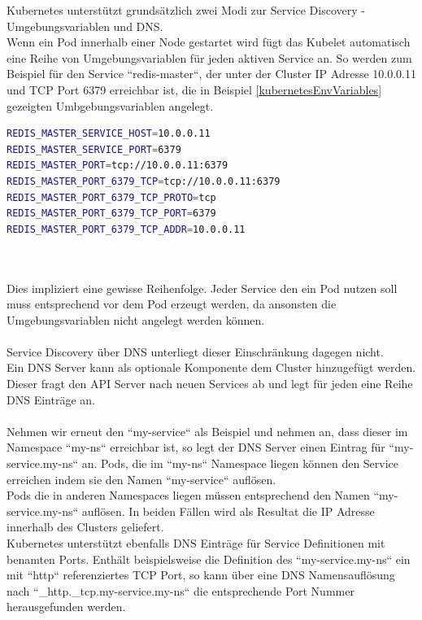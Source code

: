 Kubernetes unterstützt grundsätzlich zwei Modi zur Service Discovery - Umgebungsvariablen und DNS.\\
Wenn ein Pod innerhalb einer Node gestartet wird fügt das Kubelet automatisch eine Reihe von Umgebungsvariablen für jeden aktiven Service an. So werden zum Beispiel für den Service ``redis-master``, der unter der Cluster IP Adresse 10.0.0.11 und TCP Port 6379 erreichbar ist, die in Beispiel \ref{kubernetesEnvVariables} gezeigten Umbgebungsvariablen angelegt.\\
\begin{minipage}{\linewidth}
	\begin{lstlisting}[frame=single,caption=Umgebungsvariablen für Service ``redis-master``, label=kubernetesEnvVariables, language=bash]
REDIS_MASTER_SERVICE_HOST=10.0.0.11
REDIS_MASTER_SERVICE_PORT=6379
REDIS_MASTER_PORT=tcp://10.0.0.11:6379
REDIS_MASTER_PORT_6379_TCP=tcp://10.0.0.11:6379
REDIS_MASTER_PORT_6379_TCP_PROTO=tcp
REDIS_MASTER_PORT_6379_TCP_PORT=6379
REDIS_MASTER_PORT_6379_TCP_ADDR=10.0.0.11
	\end{lstlisting}
\end{minipage}\\\\
Dies impliziert eine gewisse Reihenfolge. Jeder Service den ein Pod nutzen soll muss entsprechend vor dem Pod erzeugt werden, da ansonsten die Umgebungsvariablen nicht angelegt werden können.\\\\
Service Discovery über DNS unterliegt dieser Einschränkung dagegen nicht.\\
Ein DNS Server kann als optionale Komponente dem Cluster hinzugefügt werden. Dieser fragt den API Server nach neuen Services ab und legt für jeden eine Reihe DNS Einträge an.\\\\
Nehmen wir erneut den ``my-service`` als Beispiel und nehmen an, dass dieser im Namespace ``my-ns`` erreichbar ist, so legt der DNS Server einen Eintrag für ``my-service.my-ns`` an. 
Pods, die im ``my-ns`` Namespace liegen können den Service erreichen indem sie den Namen ``my-service`` auflösen.\\
Pods die in anderen Namespaces liegen müssen entsprechend den Namen ``my-service.my-ns`` auflösen. In beiden Fällen wird als Resultat die IP Adresse innerhalb des Clusters geliefert.\\
Kubernetes unterstützt ebenfalls DNS Einträge für Service Definitionen mit benamten Ports. Enthält beispielsweise die Definition des ``my-service.my-ns`` ein mit ``http`` referenziertes TCP Port, so kann über eine DNS Namensauflösung nach ``\_http.\_tcp.my-service.my-ns`` die entsprechende Port Nummer herausgefunden werden.\\\\

